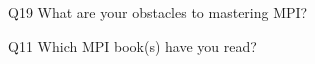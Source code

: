 \begin{description}%
\item{Q19} What are your obstacles to mastering MPI?%
\item{Q11} Which MPI book(s) have you read?%
\end{description}%
